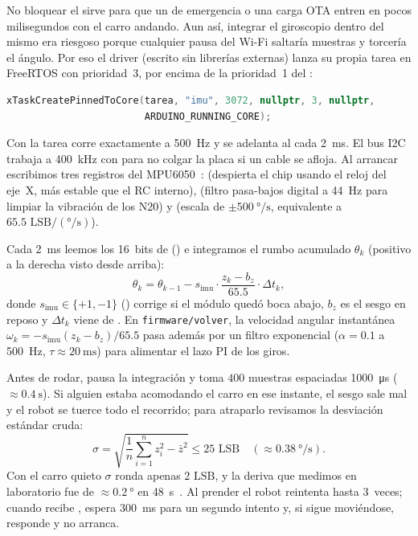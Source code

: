 No bloquear el  sirve para que un  de emergencia o una carga OTA entren en pocos milisegundos con el carro andando. Aun así, integrar el giroscopio dentro del mismo  era riesgoso porque cualquier pausa del Wi-Fi saltaría muestras y torcería el ángulo. Por eso el driver  (escrito sin librerías externas) lanza su propia tarea en FreeRTOS con prioridad~3, por encima de la prioridad~1 del :
\begin{lstlisting}[language=C++,numbers=none]
xTaskCreatePinnedToCore(tarea, "imu", 3072, nullptr, 3, nullptr,
                        ARDUINO_RUNNING_CORE);
\end{lstlisting}
Con  la tarea corre exactamente a \SI{500}{\hertz} y se adelanta al  cada \SI{2}{\milli\second}. El bus I2C trabaja a \SI{400}{\kilo\hertz} con  para no colgar la placa si un cable se afloja. Al arrancar escribimos tres registros del MPU6050~\cite{invensense2013mpu6050}:  (despierta el chip usando el reloj del eje~X, más estable que el RC interno),  (filtro pasa-bajos digital a \SI{44}{\hertz} para limpiar la vibración de los N20) y  (escala de $\pm\SI{500}{\degree\per\second}$, equivalente a $65.5\text{ LSB}/(\text{°/s})$).

Cada \SI{2}{\milli\second} leemos los 16~bits de  () e integramos el rumbo acumulado $\theta_k$ (positivo a la derecha visto desde arriba):
\begin{equation}
  \theta_k = \theta_{k-1} - s_{\text{imu}} \cdot \frac{z_k - b_z}{65.5} \cdot \Delta t_k,
  \label{eq:integracion-imu}
\end{equation}
donde $s_{\text{imu}} \in \{+1, -1\}$ () corrige si el módulo quedó boca abajo, $b_z$ es el sesgo en reposo y $\Delta t_k$ viene de . En \texttt{firmware/volver}, la velocidad angular instantánea $\omega_k = -s_{\text{imu}}(z_k - b_z)/65.5$ pasa además por un filtro exponencial ($\alpha = 0.1$ a \SI{500}{\hertz}, $\tau \approx \SI{20}{\milli\second}$) para alimentar el lazo PI de los giros.

Antes de rodar,  pausa la integración y toma $400$ muestras espaciadas \SI{1000}{\micro\second} ($\approx\SI{0.4}{\second}$). Si alguien estaba acomodando el carro en ese instante, el sesgo sale mal y el robot se tuerce todo el recorrido; para atraparlo revisamos la desviación estándar cruda:
\begin{equation}
  \sigma = \sqrt{\frac{1}{n}\sum_{i=1}^{n} z_i^2 - \bar{z}^2} \le 25\text{ LSB}\quad (\approx\SI{0.38}{\degree\per\second}).
\end{equation}
Con el carro quieto $\sigma$ ronda apenas $2\text{ LSB}$, y la deriva que medimos en laboratorio fue de $\approx\SI{0.2}{\degree}$ en \SI{48}{\second}~\cite{arquitectura2026doc}. Al prender el robot reintenta hasta 3~veces; cuando recibe ,  espera \SI{300}{\milli\second} para un segundo intento y, si sigue moviéndose, responde  y no arranca.

